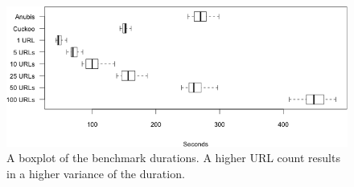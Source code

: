 
\begin{figure}[h!]
    \centering
    \centerline{\includegraphics[width=15cm]{Images/chart-box.png}}
    \caption{A boxplot of the benchmark durations. A higher URL count results in a higher variance of the duration.}
    \label{fig:chart-box}
\end{figure}

